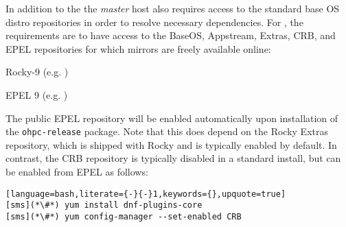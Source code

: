In addition to the \OHPC{}
\iftoggle{isxCAT}{and \xCAT{} package repositories,}{package repository,}
the {\em master} host also requires access to the standard base OS distro
repositories in order to resolve necessary dependencies. For \baseOS{}, the
requirements are to have access to the BaseOS, Appstream, Extras, CRB,
and EPEL repositories for which mirrors are freely available online:

\begin{itemize*}
\item Rocky-9
  (e.g. \href{http://download.rockylinux.org/pub/rocky/9/}
             {\color{blue}{http://download.rockylinux.org/pub/rocky/9/}} )
\item EPEL 9 (e.g. \href{http://download.fedoraproject.org/pub/epel/9/}
                        {\color{blue}{http://download.fedoraproject.org/pub/epel/9/}} )
\end{itemize*}

\noindent The public EPEL repository will be enabled automatically upon
installation of the \texttt{ohpc-release} package. Note that this does depend
on the Rocky Extras repository, which is shipped with Rocky and is typically
enabled by default.  In contrast, the CRB repository is typically
disabled in a standard install, but can be enabled from EPEL as follows:

\begin{lstlisting}[language=bash,literate={-}{-}1,keywords={},upquote=true]
[sms](*\#*) yum install dnf-plugins-core
[sms](*\#*) yum config-manager --set-enabled CRB
\end{lstlisting}
